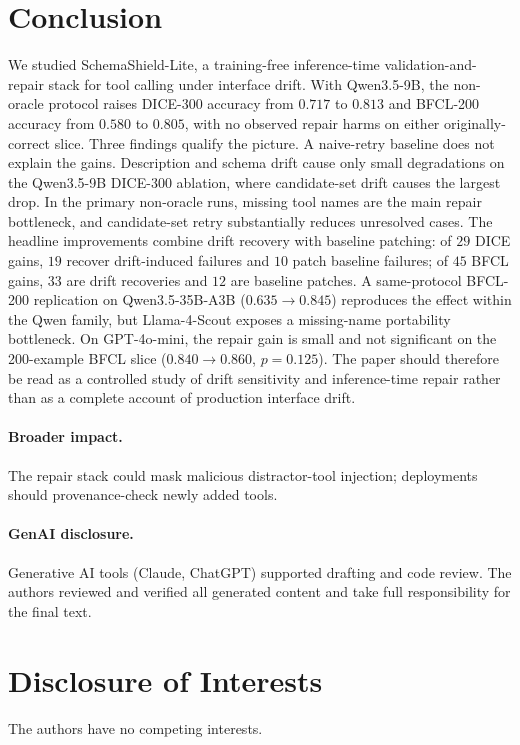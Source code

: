 \documentclass{llncs}
\newcommand{\method}{SchemaShield-Lite\xspace}
\begin{document}
\section{Conclusion}
We studied \method, a training-free inference-time validation-and-repair stack for
tool calling under interface drift. With Qwen3.5-9B, the non-oracle protocol raises
DICE-300 accuracy from $0.717$ to $0.813$ and BFCL-200 accuracy from $0.580$ to
$0.805$, with no observed repair harms on either originally-correct slice. Three
findings qualify the picture. A naive-retry baseline does not
explain the gains. Description and schema drift cause only small degradations on
the Qwen3.5-9B DICE-300 ablation, where candidate-set drift causes the largest
drop. In the primary non-oracle runs, missing tool names are the main repair
bottleneck, and candidate-set retry substantially reduces unresolved cases. The
headline improvements combine drift recovery with baseline patching: of $29$
DICE gains, $19$ recover drift-induced failures and $10$ patch baseline failures;
of $45$ BFCL gains, $33$ are drift recoveries and $12$ are baseline patches. A
same-protocol BFCL-200 replication on Qwen3.5-35B-A3B ($0.635 \rightarrow
0.845$) reproduces the effect within the Qwen family, but Llama-4-Scout exposes a
missing-name portability bottleneck. On GPT-4o-mini, the repair gain is small and
not significant on the 200-example BFCL slice ($0.840 \rightarrow 0.860$,
$p=0.125$). The paper should therefore be read as a controlled study of drift
sensitivity and inference-time repair rather than as a complete account of
production interface drift.

\paragraph{Broader impact.}
The repair stack could mask malicious distractor-tool injection; deployments should
provenance-check newly added tools.

\paragraph{GenAI disclosure.}
Generative AI tools (Claude, ChatGPT) supported drafting and code review. The authors
reviewed and verified all generated content and take full responsibility for the final text.

\section*{Disclosure of Interests}
The authors have no competing interests.



\end{document}
